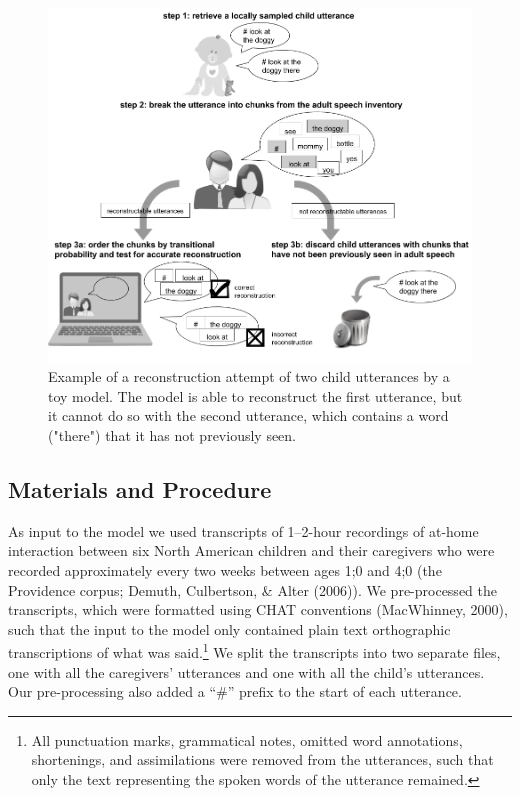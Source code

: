 \documentclass[man,mask,floatsintext]{apa6}
\theoremstyle{definition}
\theoremstyle{definition}
\theoremstyle{definition}
\theoremstyle{remark}
\begin{document}
\begin{figure}

{\centering \includegraphics[width=0.95\linewidth]{images/reconstruction_task} 

}

\caption{Example of a reconstruction attempt of two child utterances by a toy model. The model is able to reconstruct the first utterance, but it cannot do so with the second utterance, which contains a word  ("there") that it has not previously seen.}\label{fig:fig2}
\end{figure}

\subsection{Materials and Procedure}\label{materials-and-procedure}

As input to the model we used transcripts of 1--2-hour recordings of
at-home interaction between six North American children and their
caregivers who were recorded approximately every two weeks between ages
1;0 and 4;0 (the Providence corpus; Demuth, Culbertson, \& Alter
(2006)). We pre-processed the transcripts, which were formatted using
CHAT conventions (MacWhinney, 2000), such that the input to the model
only contained plain text orthographic transcriptions of what was
said.\footnote{All punctuation marks, grammatical notes, omitted word
  annotations, shortenings, and assimilations were removed from the
  utterances, such that only the text representing the spoken words of
  the utterance remained.} We split the transcripts into two separate
files, one with all the caregivers' utterances and one with all the
child's utterances. Our pre-processing also added a \enquote{\#} prefix
to the start of each utterance.
\end{document}
